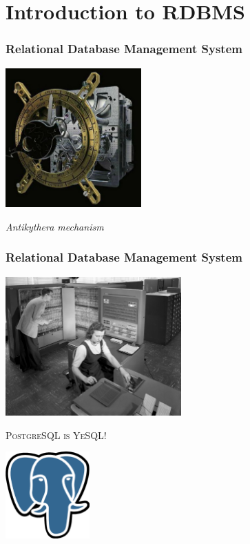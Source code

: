 \documentclass{beamer}
\begin{document}
\section{Introduction to RDBMS}

\begin{frame}
  \frametitle{Relational Database Management System}

  \begin{center}
    \includegraphics[height=2.1in]{anticy6.jpg}
  \end{center}

  \vfill
  \begin{center}
    \textit{Antikythera mechanism}
  \end{center}
\end{frame}

\begin{frame}
  \frametitle{Relational Database Management System}

  \begin{center}
    \includegraphics[height=2.1in]{IBM_Electronic_Data_Processing_Machine_-_GPN-2000-001881.jpg}
  \end{center}
\end{frame}

\begin{frame}
  \begin{center}
    \textsc{\Huge PostgreSQL is YeSQL!}
    \vfill

    \includegraphics[height=9em]{postgres-logo.eps}
  \end{center}
\end{frame}
\end{document}
